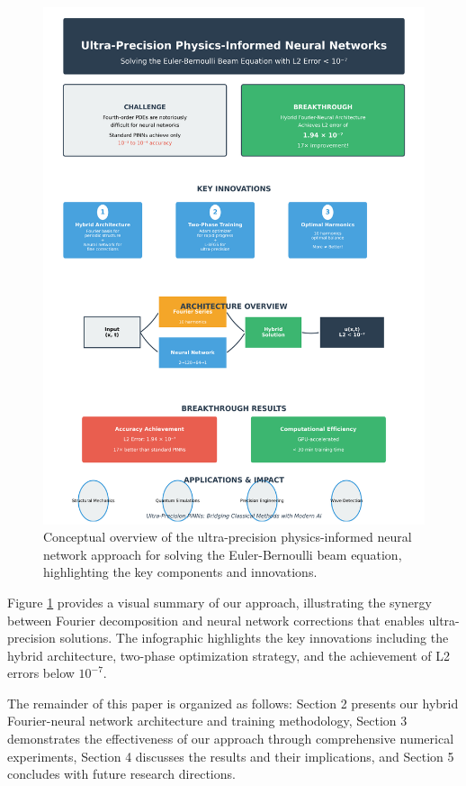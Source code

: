 \begin{figure}[ht]
    \centering
    \includegraphics[width = 1.0\linewidth]{figures/infographic.png}
    \caption{Conceptual overview of the ultra-precision physics-informed neural network approach for solving the Euler-Bernoulli beam equation, highlighting the key components and innovations.}
    \label{fig:infographic}
\end{figure}

Figure \ref{fig:infographic} provides a visual summary of our approach, illustrating the synergy between Fourier decomposition and neural network corrections that enables ultra-precision solutions. The infographic highlights the key innovations including the hybrid architecture, two-phase optimization strategy, and the achievement of L2 errors below $10^{-7}$.

The remainder of this paper is organized as follows: Section 2 presents our hybrid Fourier-neural network architecture and training methodology, Section 3 demonstrates the effectiveness of our approach through comprehensive numerical experiments, Section 4 discusses the results and their implications, and Section 5 concludes with future research directions.